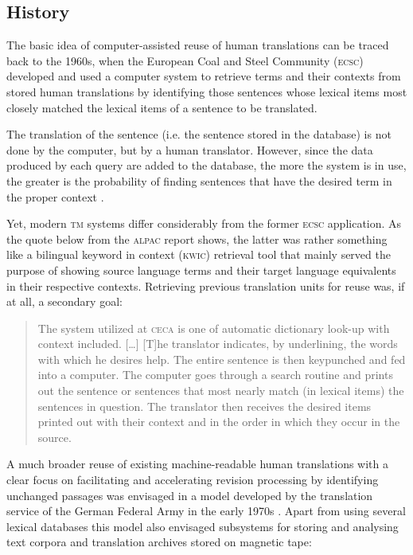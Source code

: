 \documentclass[output=paper]{LSP/langsci}
\begin{document}
\subsection{History}\label{sec:reinke:2.1}

The basic idea of computer-assisted reuse of human translations can be traced back to the 1960s, when the European Coal and Steel Community (\textsc{ecsc}) developed and used a computer system to retrieve terms and their contexts from stored human translations by identifying those sentences whose lexical items most closely matched the lexical items of a sentence to be translated.

The translation of the sentence (i.e. the sentence stored in the database) is not done by the computer, but by a human translator. However, since the data produced by each query are added to the database, the more the system is in use, the greater is the probability of finding sentences that have the desired term in the proper context \citep[27]{ALPAC1966}.

Yet, modern \textsc{tm} systems differ considerably from the former \textsc{ecsc} application. As the quote below from the \textsc{alpac} report shows, the latter was rather something like a bilingual keyword in context (\textsc{kwic}) retrieval tool that mainly served the purpose of showing source language terms and their target language equivalents in their respective contexts. Retrieving previous translation units for reuse was, if at all, a secondary goal:

\begin{quotation}
The system utilized at \textsc{ceca} is one of automatic dictionary look-up with context included. [\ldots] [T]he translator indicates, by underlining, the words with which he desires help. The entire sentence is then keypunched and fed into a computer. The computer goes through a search routine and prints out the sen\-tence or sentences that most nearly match (in lexical items) the sentences in question. The translator then receives the desired items printed out with their context and in the order in which they occur in the source. \citep[27]{ALPAC1966}
\end{quotation}

A much broader reuse of existing machine-readable human translations with a clear focus on facilitating and accelerating revision processing by identifying unchanged passages was envisaged in a model developed by the translation service of the German Federal Army in the early 1970s \citep{Krollmann1971}. Apart from using several lexical databases this model also envisaged subsystems for storing and analysing text corpora and translation archives stored on magnetic tape:
\end{document}
